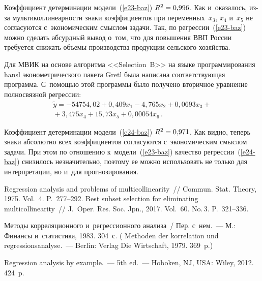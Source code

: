 \begin{multicols}{2}
  Коэффициент детерминации модели~(\ref{e23-baz}) $R^2\hm= 0{,}996$. Как 
и~оказалось, из-за мультиколлинеарности знаки коэффициентов при 
переменных~$x_3$, $x_4$ и~$x_5$ не согласуются с~экономическим смыслом 
задачи. Так, по регрессии~(\ref{e23-baz}) можно сделать абсурдный вывод о~том, 
что для повышения ВВП России требуется снижать объемы производства 
продукции сельского хозяйства.
  
  Для МВИК на основе алгоритма <<Selection~B>> на языке программирования 
hansl эконометрического пакета Gretl была написана соответствующая программа. 
С~помощью этой программы было получено вторичное уравнение полносвязной 
регрессии:
  \begin{multline}
  \tilde{y}=-54754{,}02+0{,}409x_1-4{,}765x_2+0{,}0693x_3+{}\\
  {}+ 3{,}475x_4 +15{,}73x_5+0{,}00054x_6\,.
  \label{e24-baz}
  \end{multline}
  
  Коэффициент детерминации модели~(\ref{e24-baz}) $R^2\hm=0{,}971$. Как 
видно, теперь знаки абсолютно всех коэффициентов согласуются 
с~экономическим смыслом задачи. При этом по отношению  
к~модели~(\ref{e23-baz}) качество регрессии~(\ref{e24-baz}) снизилось 
незначительно, поэтому ее можно использовать не только для интерпретации, но и~для прогнозирования.
  
{\small\frenchspacing
{%
\begin{thebibliography}{99}
 Regression analysis and problems of multicollinearity~// 
Commun. Stat. Theory, 1975. Vol.~4. P.~277--292.
 Best subset 
selection for eliminating multicollinearity~// J.~Oper. Res. Soc.  Jpn., 2017. Vol.~60. 
No.\,3. P.~321--336.

 Методы корреляционного и~регрессионного анализа~/
Пер. с~нем.~--- М.: Финансы 
и~статистика, 1983. 304~с.
( Methoden der korrelation und regressionsanalyse.~--- 
Berlin: Verlag Die Wirtschaft, 1979. 369~p.)

 Regression analysis by example.~--- 5th ed.~--- Hoboken, NJ, USA: 
Wiley, 2012. 424~p. 


\end{thebibliography}}}
\end{multicols}
